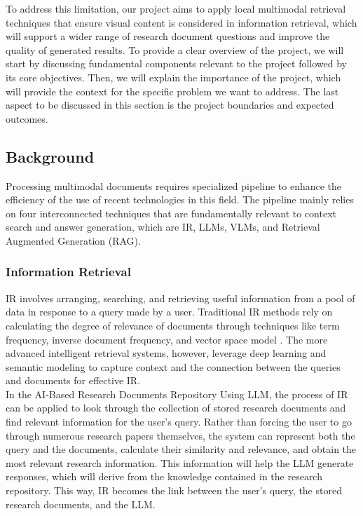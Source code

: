 \documentclass[11pt,a4paper]{report}
\begin{document}
To address this limitation, our project aims to apply local multimodal retrieval techniques that ensure visual content is considered in information retrieval, which will support a wider range of research document questions and improve the quality of generated results. To provide a clear overview of the project, we will start by discussing fundamental components relevant to the project followed by its core objectives. Then, we will explain the importance of the project, which will provide the context for the specific problem we want to address. The last aspect to be discussed in this section is the project boundaries and expected outcomes.

\subsection{Background}
Processing multimodal documents requires specialized pipeline to enhance the efficiency of the use of recent technologies in this field. The pipeline mainly relies on four interconnected techniques that are fundamentally relevant to context search and answer generation, which are \ac{IR}, \acp{LLM}, \acp{VLM}, and Retrieval Augmented Generation (\ac{RAG}). 

\subsubsection{Information Retrieval}
\ac{IR} involves arranging, searching, and retrieving useful information from a pool of data in response to a query made by a user. Traditional \ac{IR} methods rely on calculating the degree of relevance of documents through techniques like term frequency, inverse document frequency, and vector space model \cite{Bhati2026IntelligentIR}. The more advanced intelligent retrieval systems, however, leverage deep learning and semantic modeling to capture context and the connection between the queries and documents for effective \ac{IR}.\\

In the AI-Based Research Documents Repository Using \ac{LLM}, the process of \ac{IR} can be applied to look through the collection of stored research documents and find relevant information for the user's query. Rather than forcing the user to go through numerous research papers themselves, the system can represent both the query and the documents, calculate their similarity and relevance, and obtain the most relevant research information. This information will help the \ac{LLM} generate responses, which will derive from the knowledge contained in the research repository. This way, \ac{IR} becomes the link between the user's query, the stored research documents, and the \ac{LLM}.
\end{document}
